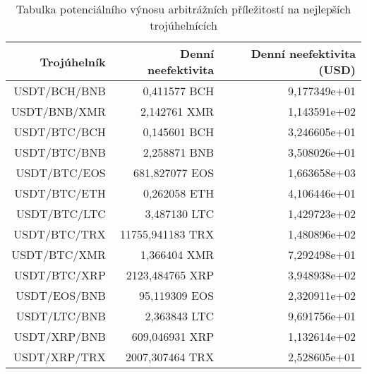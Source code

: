 \begin{table}\centering
\caption{Tabulka potenciálního výnosu arbitrážních příležitostí na nejlepších trojúhelnících}
\label{table_gains_best}
\begin{tabular}{|| r | r | r ||}\hline Trojúhelník & Denní neefektivita & Denní neefektivita (USD)\\ [0.5ex]
 \hline\hline USDT/BCH/BNB & 0,411577 BCH & 9,177349e+01\\ 
 \hline USDT/BNB/XMR & 2,142761 XMR & 1,143591e+02\\ 
 \hline USDT/BTC/BCH & 0,145601 BCH & 3,246605e+01\\ 
 \hline USDT/BTC/BNB & 2,258871 BNB & 3,508026e+01\\ 
 \hline USDT/BTC/EOS & 681,827077 EOS & 1,663658e+03\\ 
 \hline USDT/BTC/ETH & 0,262058 ETH & 4,106446e+01\\ 
 \hline USDT/BTC/LTC & 3,487130 LTC & 1,429723e+02\\ 
 \hline USDT/BTC/TRX & 11755,941183 TRX & 1,480896e+02\\ 
 \hline USDT/BTC/XMR & 1,366404 XMR & 7,292498e+01\\ 
 \hline USDT/BTC/XRP & 2123,484765 XRP & 3,948938e+02\\ 
 \hline USDT/EOS/BNB & 95,119309 EOS & 2,320911e+02\\ 
 \hline USDT/LTC/BNB & 2,363843 LTC & 9,691756e+01\\ 
 \hline USDT/XRP/BNB & 609,046931 XRP & 1,132614e+02\\ 
 \hline USDT/XRP/TRX & 2007,307464 TRX & 2,528605e+01\\ 
 \hline
\end{tabular}
\end{table}